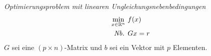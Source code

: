 \begin{definition}
\emph{Optimierungsproblem mit linearen Ungleichungsnebenbedingungen}
\begin{align}
  \min_{x \in \mathbb{R}^n}\ & f(x) \label{eq:opmlgnb} \\
              \text{\em Nb. } & Gx = r \notag
\end{align}
$G$ sei eine $(p \times n)$-Matrix und $b$ sei ein Vektor mit $p$ Elementen.
\end{definition}
